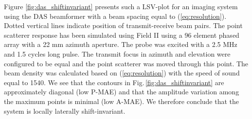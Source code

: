 \documentclass[draftcls]{IEEEtran}
\begin{document}
Figure \ref{fig:das_shiftinvariant} presents such a LSV-plot for an imaging system using the DAS beamformer with a beam spacing equal to (\ref{eq:resolution}). Dotted vertical lines indicate position of transmit-receive beam pairs. The point scatterer response has been simulated using Field II \cite{Jensen1992, Jensen1996a} using a 96 element phased array with a 22 mm azimuth aperture.  The probe was excited with a 2.5 MHz and 1.5 cycles long pulse. The transmit focus in azimuth and elevation were configured to be equal and the point scatterer was moved through this point. The beam density was calculated  based on (\ref{eq:resolution}) with the speed of sound equal to 1540. We see that the contours in Fig.\,\ref{fig:das_shiftinvariant} are approximately diagonal (low P-MAE) and that the amplitude variation among the maximum points is minimal (low A-MAE). We therefore conclude that the system is locally laterally shift-invariant. %


\end{document}
